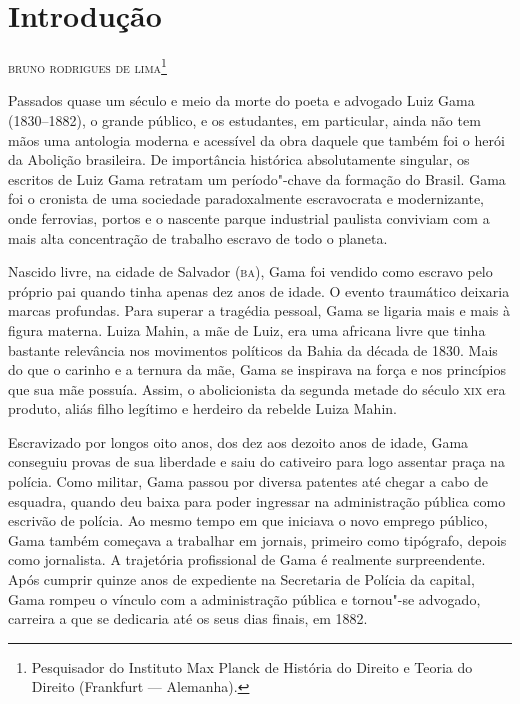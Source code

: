 \chapter{Introdução}

\begin{flushright}
\textsc{bruno rodrigues de lima}\footnote[*]{Pesquisador do Instituto Max Planck de História do Direito e Teoria do
Direito (Frankfurt --- Alemanha).}
\end{flushright}
\bigskip


Passados quase um século e meio da morte do poeta e advogado Luiz Gama
(1830--1882), o grande público, e os estudantes, em particular, ainda não
tem mãos uma antologia moderna e acessível da obra daquele que também
foi o herói da Abolição brasileira. De importância histórica
absolutamente singular, os escritos de Luiz Gama retratam um
período"-chave da formação do Brasil. Gama foi o cronista de uma
sociedade paradoxalmente escravocrata e modernizante, onde ferrovias,
portos e o nascente parque industrial paulista conviviam com a mais
alta concentração de trabalho escravo de todo o planeta.

Nascido livre, na cidade de Salvador (\textsc{ba}), Gama foi vendido como escravo
pelo próprio pai quando tinha apenas dez anos de idade. O evento
traumático deixaria marcas profundas. Para superar a tragédia pessoal,
Gama se ligaria mais e mais à figura materna. Luiza Mahin, a mãe de
Luiz, era uma africana livre que tinha bastante relevância nos
movimentos políticos da Bahia da década de 1830. Mais do que o carinho e
a ternura da mãe, Gama se inspirava na força e nos princípios que sua
mãe possuía. Assim, o abolicionista da segunda metade do século \textsc{xix} era
produto, aliás filho legítimo e herdeiro da rebelde Luiza Mahin.

Escravizado por longos oito anos, dos dez aos dezoito anos de idade,
Gama conseguiu provas de sua liberdade e saiu do cativeiro para logo
assentar praça na polícia. Como militar, Gama passou por diversa
patentes até chegar a cabo de esquadra, quando deu baixa para poder
ingressar na administração pública como escrivão de polícia. Ao mesmo
tempo em que iniciava o novo emprego público, Gama também começava a
trabalhar em jornais, primeiro como tipógrafo, depois como jornalista. A
trajetória profissional de Gama é realmente surpreendente. Após cumprir
quinze anos de expediente na Secretaria de Polícia da capital, Gama
rompeu o vínculo com a administração pública e tornou"-se advogado,
carreira a que se dedicaria até os seus dias finais, em 1882.

